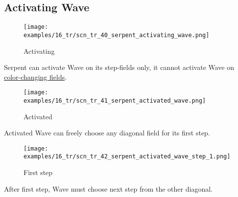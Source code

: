 \clearpage %

\subsection*{Activating Wave}
\label{sec:Tamoanchan Revisited/Serpent/Activating Wave}

\vspace*{-0.7\baselineskip}
\noindent
\begin{wrapfigure}[3]{l}{0.4\textwidth}
\centering
\texttt{[image: examples/16\_tr/scn\_tr\_40\_serpent\_activating\_wave.png]}
\vspace*{-0.4\baselineskip}
\caption{Activating}
\label{fig:scn_tr_40_serpent_activating_wave}
\end{wrapfigure}
Serpent can activate Wave on its step-fields only, it cannot activate Wave
on \hyperref[fig:scn_tr_17_serpent_neighbors]{color-changing fields}.

\vspace*{7.0\baselineskip}
\noindent
\begin{wrapfigure}[2]{l}{0.4\textwidth}
\centering
\texttt{[image: examples/16\_tr/scn\_tr\_41\_serpent\_activated\_wave.png]}
\vspace*{-0.4\baselineskip}
\caption{Activated}
\label{fig:scn_tr_41_serpent_activated_wave}
\end{wrapfigure}
Activated Wave can freely choose any diagonal field for its first step.

\vspace*{8.0\baselineskip}
\noindent
\begin{wrapfigure}[2]{l}{0.4\textwidth}
\centering
\texttt{[image: examples/16\_tr/scn\_tr\_42\_serpent\_activated\_wave\_step\_1.png]}
\vspace*{-0.4\baselineskip}
\caption{First step}
\label{fig:scn_tr_42_serpent_activated_wave_step_1}
\end{wrapfigure}
After first step, Wave must choose next step from the other diagonal.

\clearpage %

